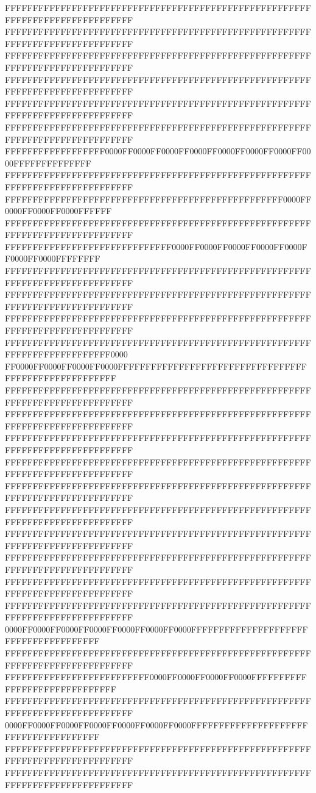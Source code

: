FFFFFFFFFFFFFFFFFFFFFFFFFFFFFFFFFFFFFFFFFFFFFFFFFFFFFFFFFFFFFFFFFFFFFFFFFFFFFF
FFFFFFFFFFFFFFFFFFFFFFFFFFFFFFFFFFFFFFFFFFFFFFFFFFFFFFFFFFFFFFFFFFFFFFFFFFFFFF
FFFFFFFFFFFFFFFFFFFFFFFFFFFFFFFFFFFFFFFFFFFFFFFFFFFFFFFFFFFFFFFFFFFFFFFFFFFFFF
FFFFFFFFFFFFFFFFFFFFFFFFFFFFFFFFFFFFFFFFFFFFFFFFFFFFFFFFFFFFFFFFFFFFFFFFFFFFFF
FFFFFFFFFFFFFFFFFFFFFFFFFFFFFFFFFFFFFFFFFFFFFFFFFFFFFFFFFFFFFFFFFFFFFFFFFFFFFF
FFFFFFFFFFFFFFFFFFFFFFFFFFFFFFFFFFFFFFFFFFFFFFFFFFFFFFFFFFFFFFFFFFFFFFFFFFFFFF
FFFFFFFFFFFFFFFFFF0000FF0000FF0000FF0000FF0000FF0000FF0000FF0000FFFFFFFFFFFFFF
FFFFFFFFFFFFFFFFFFFFFFFFFFFFFFFFFFFFFFFFFFFFFFFFFFFFFFFFFFFFFFFFFFFFFFFFFFFFFF
FFFFFFFFFFFFFFFFFFFFFFFFFFFFFFFFFFFFFFFFFFFFFFFFFF0000FF0000FF0000FF0000FFFFFF
FFFFFFFFFFFFFFFFFFFFFFFFFFFFFFFFFFFFFFFFFFFFFFFFFFFFFFFFFFFFFFFFFFFFFFFFFFFFFF
FFFFFFFFFFFFFFFFFFFFFFFFFFFFFF0000FF0000FF0000FF0000FF0000FF0000FF0000FFFFFFFF
FFFFFFFFFFFFFFFFFFFFFFFFFFFFFFFFFFFFFFFFFFFFFFFFFFFFFFFFFFFFFFFFFFFFFFFFFFFFFF
FFFFFFFFFFFFFFFFFFFFFFFFFFFFFFFFFFFFFFFFFFFFFFFFFFFFFFFFFFFFFFFFFFFFFFFFFFFFFF
FFFFFFFFFFFFFFFFFFFFFFFFFFFFFFFFFFFFFFFFFFFFFFFFFFFFFFFFFFFFFFFFFFFFFFFFFFFFFF
FFFFFFFFFFFFFFFFFFFFFFFFFFFFFFFFFFFFFFFFFFFFFFFFFFFFFFFFFFFFFFFFFFFFFFFFFF0000
FF0000FF0000FF0000FF0000FFFFFFFFFFFFFFFFFFFFFFFFFFFFFFFFFFFFFFFFFFFFFFFFFFFFFF
FFFFFFFFFFFFFFFFFFFFFFFFFFFFFFFFFFFFFFFFFFFFFFFFFFFFFFFFFFFFFFFFFFFFFFFFFFFFFF
FFFFFFFFFFFFFFFFFFFFFFFFFFFFFFFFFFFFFFFFFFFFFFFFFFFFFFFFFFFFFFFFFFFFFFFFFFFFFF
FFFFFFFFFFFFFFFFFFFFFFFFFFFFFFFFFFFFFFFFFFFFFFFFFFFFFFFFFFFFFFFFFFFFFFFFFFFFFF
FFFFFFFFFFFFFFFFFFFFFFFFFFFFFFFFFFFFFFFFFFFFFFFFFFFFFFFFFFFFFFFFFFFFFFFFFFFFFF
FFFFFFFFFFFFFFFFFFFFFFFFFFFFFFFFFFFFFFFFFFFFFFFFFFFFFFFFFFFFFFFFFFFFFFFFFFFFFF
FFFFFFFFFFFFFFFFFFFFFFFFFFFFFFFFFFFFFFFFFFFFFFFFFFFFFFFFFFFFFFFFFFFFFFFFFFFFFF
FFFFFFFFFFFFFFFFFFFFFFFFFFFFFFFFFFFFFFFFFFFFFFFFFFFFFFFFFFFFFFFFFFFFFFFFFFFFFF
FFFFFFFFFFFFFFFFFFFFFFFFFFFFFFFFFFFFFFFFFFFFFFFFFFFFFFFFFFFFFFFFFFFFFFFFFFFFFF
FFFFFFFFFFFFFFFFFFFFFFFFFFFFFFFFFFFFFFFFFFFFFFFFFFFFFFFFFFFFFFFFFFFFFFFFFFFFFF
FFFFFFFFFFFFFFFFFFFFFFFFFFFFFFFFFFFFFFFFFFFFFFFFFFFFFFFFFFFFFFFFFFFFFFFFFFFFFF
0000FF0000FF0000FF0000FF0000FF0000FF0000FFFFFFFFFFFFFFFFFFFFFFFFFFFFFFFFFFFFFF
FFFFFFFFFFFFFFFFFFFFFFFFFFFFFFFFFFFFFFFFFFFFFFFFFFFFFFFFFFFFFFFFFFFFFFFFFFFFFF
FFFFFFFFFFFFFFFFFFFFFFFFFF0000FF0000FF0000FF0000FFFFFFFFFFFFFFFFFFFFFFFFFFFFFF
FFFFFFFFFFFFFFFFFFFFFFFFFFFFFFFFFFFFFFFFFFFFFFFFFFFFFFFFFFFFFFFFFFFFFFFFFFFFFF
0000FF0000FF0000FF0000FF0000FF0000FF0000FFFFFFFFFFFFFFFFFFFFFFFFFFFFFFFFFFFFFF
FFFFFFFFFFFFFFFFFFFFFFFFFFFFFFFFFFFFFFFFFFFFFFFFFFFFFFFFFFFFFFFFFFFFFFFFFFFFFF
FFFFFFFFFFFFFFFFFFFFFFFFFFFFFFFFFFFFFFFFFFFFFFFFFFFFFFFFFFFFFFFFFFFFFFFFFFFFFF
